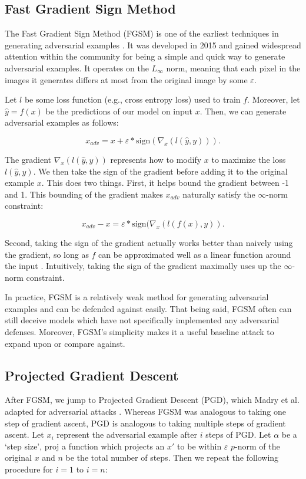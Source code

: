 \documentclass{article}
\newcommand{\adv}{x_{adv}}
\newcommand{\sign}{\text{sign}}
\newcommand{\proj}{\text{proj}}
\begin{document}
\subsection{Fast Gradient Sign Method}
\label{sub:fgsm}

The Fast Gradient Sign Method (FGSM) is one of the earliest techniques in generating adversarial examples \cite{goodfellow2015explaining}. It was developed in 2015 and gained widespread attention within the community for being a simple and quick way to generate adversarial examples. It operates on the $L_\infty$ norm, meaning that each pixel in the images it generates differs at most from the original image by some $\varepsilon$.

Let $l$ be some loss function (e.g., cross entropy loss) used to train $f$. Moreover, let $\hat{y} = f(x)$ be the predictions of our model on input $x$. Then, we can generate adversarial examples as follows:

\[
    \adv = x + \varepsilon * \sign(\nabla_{x}(l(\hat{y},y))).
\]

\noindent The gradient $\nabla_{x}(l(\hat{y},y))$ represents how to modify $x$ to maximize the loss $l(\hat{y}, y)$. We then take the sign of the gradient before adding it to the original example $x$. This does two things. First, it helps bound the gradient between -1 and 1. This bounding of the gradient makes $\adv$ naturally satisfy the $\infty$-norm constraint:

\[
    \adv - x = \varepsilon * \sign(\nabla_{x}(l(f(x),y)).
\]

\noindent Second, taking the sign of the gradient actually works better than naively using the gradient, so long as $f$ can be approximated well as a linear function around the input \cite{goodfellow2015explaining}. Intuitively, taking the sign of the gradient maximally uses up the $\infty$-norm constraint.

In practice, FGSM is a relatively weak method for generating adversarial examples and can be defended against easily. That being said, FGSM often can still deceive models which have not specifically implemented any adversarial defenses. Moreover, FGSM's simplicity makes it a useful baseline attack to expand upon or compare against.

\subsection{Projected Gradient Descent}
\label{sub:pgd}
After FGSM, we jump to Projected Gradient Descent (PGD), which Madry et al. adapted for adversarial attacks \cite{madry2019deep}. Whereas FGSM was analogous to taking one step of gradient ascent, PGD is analogous to taking multiple steps of gradient ascent. Let $x_i$ represent the adversarial example after $i$ steps of PGD. Let $\alpha$ be a `step size', $\proj$ a function which projects an $x'$ to be within $\varepsilon$ $p$-norm of the original $x$ and $n$ be the total number of steps. Then we repeat the following procedure for $i=1$ to $i=n$:
\end{document}
